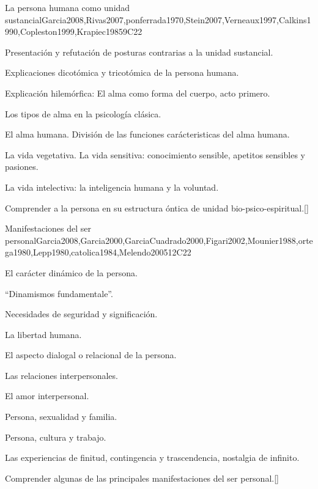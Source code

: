 \begin{syllabus}
\begin{unit}{}{La persona humana como unidad sustancial}{Garcia2008,Rivas2007,ponferrada1970,Stein2007,Verneaux1997,Calkins1990,Copleston1999,Krapiec1985}{9}{C22}
\begin{topics}
	\item Presentación y refutación de posturas contrarias a la unidad sustancial.
	\item Explicaciones dicotómica y tricotómica de la persona humana. 
	\item Explicación hilemórfica: El alma como forma del cuerpo, acto primero.
	\item Los tipos de alma en la psicología clásica.
	\item El alma humana. División de las funciones carácteristicas del alma humana.
	\item La vida vegetativa. La vida sensitiva: conocimiento sensible, apetitos sensibles y pasiones.
	\item La vida intelectiva: la inteligencia humana y la voluntad.
\end{topics}
\begin{learningoutcomes}
	\item Comprender a la persona en su estructura óntica de unidad bio-psico-espiritual.[\Usage]
\end{learningoutcomes}
\end{unit}

\begin{unit}{}{Manifestaciones del ser personal}{Garcia2008,Garcia2000,GarciaCuadrado2000,Figari2002,Mounier1988,ortega1980,Lepp1980,catolica1984,Melendo2005}{12}{C22}
\begin{topics}
	\item El carácter dinámico de la persona.
	\item ``Dinamismos fundamentale''.
	\item Necesidades de seguridad y significación.
	\item La libertad humana.
	\item El aspecto dialogal o relacional de la persona. 
	\item Las relaciones interpersonales. 
	\item El amor interpersonal.
	\item Persona, sexualidad y familia.
	\item Persona, cultura y trabajo.
	\item Las experiencias de finitud, contingencia y trascendencia, nostalgia de infinito.
\end{topics}
\begin{learningoutcomes}
	\item Comprender algunas de las principales manifestaciones del ser personal.[\Usage]
\end{learningoutcomes}
\end{unit}


\end{syllabus}
